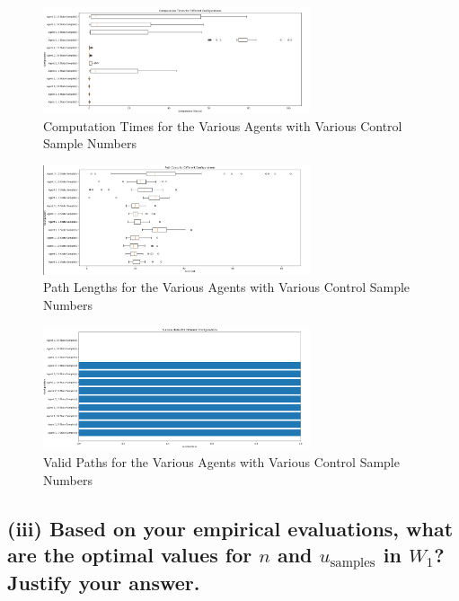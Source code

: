 \documentclass{article}
\begin{document}
\begin{figure}[H]
    \centering
    \includegraphics[width=0.7\textwidth]{1diiTimes.png} 
    \caption{Computation Times for the Various Agents with Various Control Sample Numbers}
    \label{fig:1diiTimes}
\end{figure}

\begin{figure}[H]
    \centering
    \includegraphics[width=0.7\textwidth]{1diiCosts.png} 
    \caption{Path Lengths for the Various Agents with Various Control Sample Numbers}
    \label{fig:1diiCosts}
\end{figure}

\begin{figure}[H]
    \centering
    \includegraphics[width=0.7\textwidth]{1diiSuccesses.png} 
    \caption{Valid Paths for the Various Agents with Various Control Sample Numbers}
    \label{fig:1diiSuccesses}
\end{figure}


\subsection*{(iii)
Based on your empirical evaluations, what are the optimal values for \( n \) and \( u_{\text{samples}} \) in \( W_1 \)? Justify your answer.
}
\end{document}
